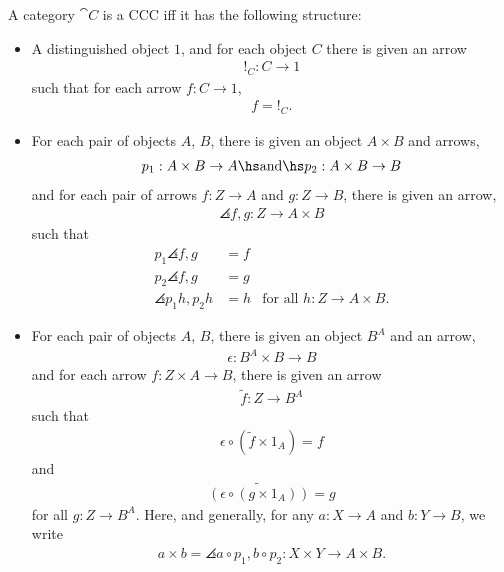 \documentclass{article}
\begin{document}
\begin{proposition}[Awodey p. 134]
	A category $\cat C$ is a CCC iff it has the following structure:

	\begin{itemize}
		\item A distinguished object $1$, and for each object $C$ there
		      is given an arrow \begin{align*}
			      !_C:C\to 1
		      \end{align*}
		      such that for each arrow $f:C\to 1$, \begin{align*}
			      f=!_C.
		      \end{align*}
		\item For each pair of objects $A$, $B$, there is given an object
		      $A\times B$ and arrows, \begin{align*}
			      p_1:A\times B \to A\hs\text{and}\hs p_2:A\times B\to B
		      \end{align*}
		      and for each pair of arrows $f:Z\to A$ and $g:Z\to B$, there is given
		      an arrow, \begin{align*}
			      \angles{f,g}:Z\to A\times B
		      \end{align*}
		      such that \begin{align*}
			      p_1\angles{f,g}    & =f                                    \\
			      p_2\angles{f,g}    & =g                                    \\
			      \angles{p_1h,p_2h} & =h & \text{for all }h:Z\to A\times B.
		      \end{align*}
		\item For each pair of objects $A$, $B$, there is given an object
		      $B^A$ and an arrow, \begin{align*}
			      \epsilon : B^A\times B \to B
		      \end{align*}
		      and for each arrow $f:Z\times A \to B$, there is given an arrow \begin{align*}
			      \tilde{f}:Z\to B^A
		      \end{align*}
		      such that \begin{align*}
			      \epsilon\circ(\tilde f \times 1_A)=f
		      \end{align*}
		      and \begin{align*}
			      \widetilde{(\epsilon\circ(g\times 1_A))}=g
		      \end{align*}
		      for all $g:Z\to B^A$. Here, and generally, for any $a:X\to A$ and
		      $b:Y\to B$, we write
		      \begin{align*}
			      a\times b = \angles{a\circ p_1, b\circ p_2}:X\times Y\to A\times B.
		      \end{align*}
	\end{itemize}
\end{proposition}
\end{document}
